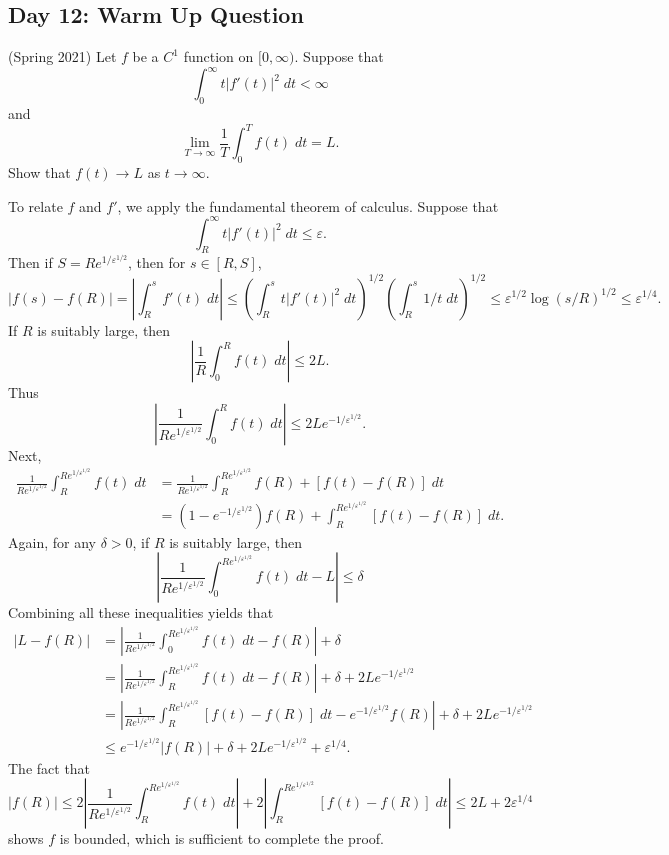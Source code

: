 \documentclass{exam}
\theoremstyle{problemstyle}
\newcommand{\1}[1]{\textbf{1}_{\left[#1\right]}} %
\begin{document}
\begin{questions}
\newpage
\section*{Day 12: Warm Up Question}

\question (Spring 2021) Let $f$ be a $C^1$ function on $[0,\infty)$. Suppose that
%
\[ \int_0^\infty t |f'(t)|^2\; dt < \infty \]
%
and
%
\[ \lim_{T \to \infty} \frac{1}{T} \int_0^T f(t)\; dt = L. \]
%
Show that $f(t) \to L$ as $t \to \infty$.
\begin{solution}
    To relate $f$ and $f'$, we apply the fundamental theorem of calculus. Suppose that
    \[ \int_R^\infty t |f'(t)|^2\; dt \leq \varepsilon. \]
    Then if $S = R e^{1/\varepsilon^{1/2}}$, then for $s \in [R,S]$,
    \[ |f(s) - f(R)| = \left| \int_R^s f'(t)\; dt \right| \leq \left( \int_R^s t |f'(t)|^2\; dt \right)^{1/2} \left( \int_R^s 1/t\; dt \right)^{1/2} \leq \varepsilon^{1/2} \log(s/R)^{1/2} \leq \varepsilon^{1/4}. \]
    If $R$ is suitably large, then
    \[ \left| \frac{1}{R} \int_0^R f(t)\; dt \right| \leq 2L. \]
    Thus
    \[ \left| \frac{1}{R e^{1/\varepsilon^{1/2}}} \int_0^R f(t)\; dt \right| \leq 2L e^{-1/\varepsilon^{1/2}}. \]
    Next,
    \begin{align*}
        \frac{1}{R e^{1/\varepsilon^{1/2}}} \int_R^{Re^{1/\varepsilon^{1/2}}} f(t)\; dt &= \frac{1}{R e^{1/\varepsilon^{1/2}}} \int_R^{Re^{1/\varepsilon^{1/2}}} f(R) + [f(t) - f(R)]\; dt\\
        &= \left( 1 - e^{-1/\varepsilon^{1/2}} \right) f(R) + \int_R^{R e^{1/\varepsilon^{1/2}}} [f(t) - f(R)]\; dt.
    \end{align*}
    Again, for any $\delta > 0$, if $R$ is suitably large, then
    \[ \left| \frac{1}{R e^{1/\varepsilon^{1/2}}} \int_0^{R e^{1/\varepsilon^{1/2}}} f(t)\; dt - L \right| \leq \delta \]
    Combining all these inequalities yields that
    \begin{align*}
        |L - f(R)| &= \left| \frac{1}{R e^{1/\varepsilon^{1/2}}} \int_0^{R e^{1/\varepsilon^{1/2}}} f(t)\; dt - f(R) \right| + \delta\\
        &= \left| \frac{1}{R e^{1/\varepsilon^{1/2}}} \int_R^{R e^{1/\varepsilon^{1/2}}} f(t)\; dt - f(R) \right| + \delta + 2Le^{-1/\varepsilon^{1/2}}\\
        &= \left| \frac{1}{R e^{1/\varepsilon^{1/2}}} \int_R^{R e^{1/\varepsilon^{1/2}}} [f(t) - f(R)]\; dt - e^{-1/\varepsilon^{1/2}} f(R) \right| + \delta + 2Le^{-1/\varepsilon^{1/2}}\\
        &\leq e^{-1/\varepsilon^{1/2}} |f(R)| + \delta + 2L e^{-1/\varepsilon^{1/2}} + \varepsilon^{1/4}.
    \end{align*}
    The fact that
    \[ |f(R)| \leq 2 \left| \frac{1}{R e^{1/\varepsilon^{1/2}}} \int_R^{Re^{1/\varepsilon^{1/2}}} f(t)\; dt \right| + 2 \left| \int_R^{R e^{1/\varepsilon^{1/2}}} [f(t) - f(R)]\; dt \right| \leq 2L + 2 \varepsilon^{1/4} \]
    shows $f$ is bounded, which is sufficient to complete the proof.
\end{solution}



\end{questions}
\end{document}
